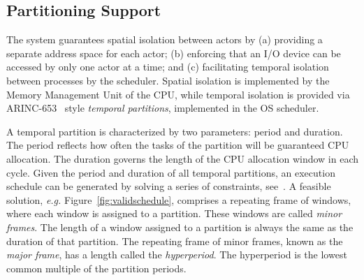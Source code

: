 
\subsection{Partitioning Support}
\label{sec:scheduler}
The system guarantees spatial isolation between actors  by (a)
providing  a separate address space for each actor; (b) enforcing that an
I/O device can be accessed by only one actor at a time; and (c)
facilitating temporal isolation between processes by the scheduler.
Spatial isolation is implemented by the Memory Management Unit of the CPU,  
while temporal isolation is provided via ARINC-653~\cite{ARINC-653} style
\textit{temporal partitions}, implemented in the OS scheduler. 


A temporal partition is characterized by two parameters: period and
duration.  The period reflects how often the tasks of the
partition will be guaranteed CPU allocation.  The duration governs the
length of the CPU allocation window in each cycle.  Given the period
and duration of all temporal partitions, an execution schedule can be
generated by solving a series of constraints, see~\cite {ACM_SPE:10}.
A feasible solution, \emph{e.g.} Figure~\ref{fig:validschedule}, comprises
a repeating frame of windows, where each window is assigned to a
partition.  These windows are called \emph{minor frames}.  The length
of a window assigned to a partition is always the same as the duration
of that partition.  The repeating frame of minor frames, known as the \emph{major frame},
has a length called the \emph{hyperperiod}.  The hyperperiod is the lowest common multiple
of the partition periods.  


